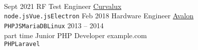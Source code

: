 \documentclass[9pt]{developercv} %
\begin{document}
\vspace{0.5cm}



\begin{minipage}[t]{0.4\textwidth} %
	\vspace{-\baselineskip} %
	
	\lorem \lorem \lorem \lorem \lorem\\ %
\end{minipage}
\hfill %
\begin{minipage}[t]{0.5\textwidth} %
	\vspace{-\baselineskip} %
	\begin{barchart}{5.5}
	\end{barchart}
\end{minipage}



\begin{entrylist}
	\entry
		{Sept 2021}
		{RF Test Engineer}
		{\href{https://Curvalux.com}{Curvalux}}
		{\lorem \lorem \lorem\\ \texttt{node.js}\slashsep\texttt{Vue.js}\slashsep\texttt{Electron}}
	\entry
		{Feb 2018}
		{Hardware Engineer}
		{\href{https://avalonrov.wixsite.com/avalonrov}{Avalon}}
		{\lorem\lorem\\ \texttt{PHP}\slashsep\texttt{JS}\slashsep\texttt{MariaDB}\slashsep\texttt{Linux}}
	\entry
		{2013 -- 2014\\\footnotesize{part time}}
		{Junior PHP Developer}
		{example.com}
		{\lorem\lorem\\ \texttt{PHP}\slashsep\texttt{Laravel}}
\end{entrylist}
\end{document}
